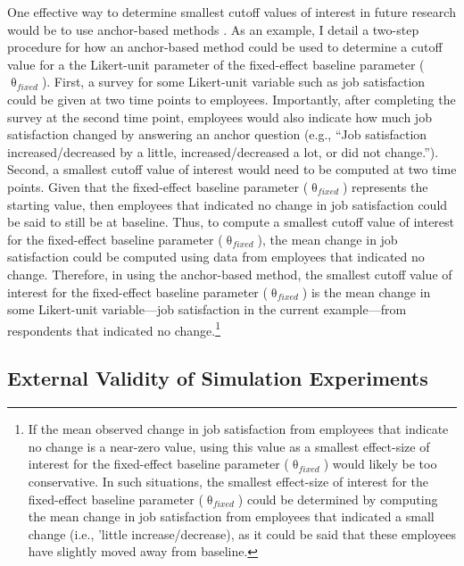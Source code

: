 \documentclass[
12pt, %
twoside,
english]{guelphthesis}
\begin{document}
One effective way to determine smallest cutoff values of interest in future research would be to use anchor-based methods \autocite{anvari2021}. As an example, I detail a two-step procedure for how an anchor-based method could be used to determine a cutoff value for a the Likert-unit parameter of the fixed-effect baseline parameter (\(\uptheta_{fixed}\)). First, a survey for some Likert-unit variable such as job satisfaction could be given at two time points to employees. Importantly, after completing the survey at the second time point, employees would also indicate how much job satisfaction changed by answering an anchor question (e.g., ``Job satisfaction increased/decreased by a little, increased/decreased a lot, or did not change.''). Second, a smallest cutoff value of interest would need to be computed at two time points. Given that the fixed-effect baseline parameter (\(\uptheta_{fixed}\)) represents the starting value, then employees that indicated no change in job satisfaction could be said to still be at baseline. Thus, to compute a smallest cutoff value of interest for the fixed-effect baseline parameter (\(\uptheta_{fixed}\)), the mean change in job satisfaction could be computed using data from employees that indicated no change. Therefore, in using the anchor-based method, the smallest cutoff value of interest for the fixed-effect baseline parameter (\(\uptheta_{fixed}\)) is the mean change in some Likert-unit variable---job satisfaction in the current example---from respondents that indicated no change.\footnote{If the mean observed change in job satisfaction from employees that indicate no change is a near-zero value, using this value as a smallest effect-size of interest for the fixed-effect baseline parameter ($\uptheta_{fixed}$) would likely be too conservative. In such situations, the smallest effect-size of interest for the fixed-effect baseline parameter ($\uptheta_{fixed}$) could be determined by computing the mean change in job satisfaction from employees that indicated a small change (i.e., 'little increase/decrease), as it could be said that these employees have slightly moved away from baseline.}

\hypertarget{external-validity-of-simulation-experiments}{%
\subsection{External Validity of Simulation Experiments}\label{external-validity-of-simulation-experiments}}
\end{document}
